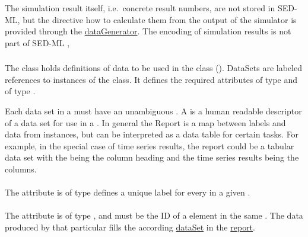 The simulation result itself, i.e.\ concrete result numbers, are not stored in SED-ML, but the directive how to calculate them from the output of the simulator is provided through the \hyperref[class:dataGenerator]{dataGenerator}. The encoding of simulation results is not part of SED-ML \currentLV, 

\begin{blockChanged}
\subsubsection{}
\label{class:dataSet}
The \DataSet class holds definitions of data to be used in the \Report class (). DataSets are labeled references to instances of the \DataGenerator class.  It defines the required attributes  of type  and  of type \SIdRef.  

Each data set in a \Report must have an unambiguous . A  is a human readable descriptor of a data set for use in a \Report.  In general the Report is a map between labels and data from \DataGenerator instances, but can be interpreted as a data table for certain tasks. For example, in the special case of time series results, the report could be a tabular data set with the  being the column heading and the time series results being the columns.

\paragraph*{}
\label{sec:label}
The  attribute is of type  defines a unique label for every \DataSet in a given \Report.

\paragraph*{}
\label{sec:dataReference}
The  attribute is of type \SIdRef, and must be the ID of a \DataGenerator element in the same \SedDocument.  The data produced by that particular \DataGenerator fills the according \hyperref[class:dataSet]{dataSet} in the \hyperref[class:report]{report}.


\end{blockChanged}

